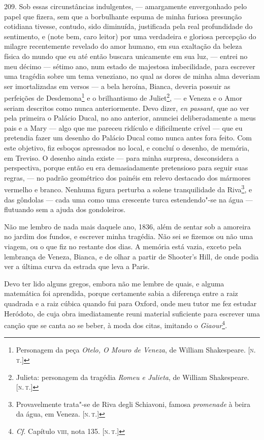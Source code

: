 209. Sob essas circunstâncias indulgentes, --- amargamente envergonhado
pelo papel que fizera, sem que a borbulhante espuma de minha furiosa
presunção cotidiana tivesse, contudo, sido diminuída, justificada pela
real profundidade do sentimento, e (note bem, caro leitor) por uma
verdadeira e gloriosa percepção do milagre recentemente revelado do amor
humano, em sua exaltação da beleza física do mundo que eu até então
buscara unicamente em sua luz, --- entrei no meu décimo --- sétimo ano, num
estado de majestosa imbecilidade, para escrever uma tragédia sobre um
tema veneziano, no qual as dores de minha alma deveriam ser
imortalizadas em versos --- a bela heroína, Bianca, deveria possuir as
perfeições de Desdemona\footnote{Personagem da peça \emph{Otelo, O Mouro
  de Veneza}, de William Shakespeare. {[}\textsc{n.\,t.}{]}} e o brilhantismo
de Juliet\footnote{Julieta: personagem da tragédia \emph{Romeu e
  Julieta}, de William Shakespeare. {[}\textsc{n.\,t.}{]}}, --- e Veneza e o
Amor seriam descritos como nunca anteriormente. Devo dizer, \emph{en
passant}, que ao ver pela primeira o Palácio Ducal, no ano anterior,
anunciei deliberadamente a meus pais e a Mary --- algo que me pareceu
ridículo e dificilmente crível --- que eu pretendia fazer um desenho do
Palácio Ducal como nunca antes fora feito. Com este objetivo, fiz
esboços apressados no local, e concluí o desenho, de memória, em
Treviso. O desenho ainda existe --- para minha surpresa, desconsidera a
perspectiva, porque então eu era demasiadamente pretensioso para seguir
suas regras, --- no padrão geométrico dos painéis em relevo destacado dos
mármores vermelho e branco. Nenhuma figura perturba a solene
tranquilidade da Riva\footnote{Provavelmente trata"-se de Riva degli
  Schiavoni, famosa \emph{promenade} à beira da água, em Veneza. {[}\textsc{n.\,t.}{]}}, e das gôndolas --- cada uma como uma crescente turca
estendendo"-se na água --- flutuando sem a ajuda dos gondoleiros.

Não me lembro de nada mais daquele ano, 1836, além de sentar sob a
amoreira no jardim dos fundos, e escrever minha tragédia. Não sei se
fizemos ou não uma viagem, ou o que fiz no restante dos dias. A memória
está vazia, exceto pela lembrança de Veneza, Bianca, e de olhar a partir
de Shooter's Hill, de onde podia ver a última curva da estrada que leva
a Paris.

Devo ter lido alguns gregos, embora não me lembre de quais, e alguma
matemática foi aprendida, porque certamente sabia a diferença entre a
raiz quadrada e a raiz cúbica quando fui para Oxford, onde meu tutor me
fez estudar Heródoto, de cuja obra imediatamente reuni material
suficiente para escrever uma canção que se canta ao se beber, à moda dos
citas, imitando o \emph{Giaour}\footnote{\emph{Cf.} Capítulo \textsc{viii}, nota
  135. {[}\textsc{n.\,t.}{]}}.

